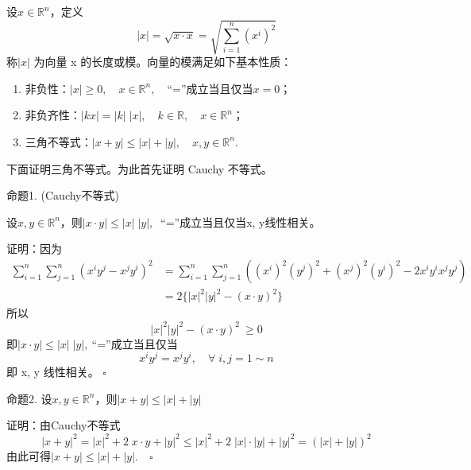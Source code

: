 \documentclass{article}
\begin{document}
\vspace{20pt}
设\(x \in \mathbb{R}^n\)，定义
\begin{equation*}
    | x |= \sqrt{x \cdot x} = \sqrt{\sum_{i=1}^n (x^i)^2 }
\end{equation*}
称\(| x |\) 为向量 x 的长度或模。向量的模满足如下基本性质：
\begin{enumerate}
    \item 非负性：\(| x | \ge 0,\quad x \in \mathbb{R}^n, \quad \)“=”成立当且仅当\(x = 0\)；
    \item 非负齐性：\(| kx |= | k |\; | x |,\quad k \in \mathbb{R},\quad x \in \mathbb{R}^n\)；
    \item 三角不等式：\(| x + y | \le | x |+ | y |,\quad x, y \in \mathbb{R}^n\).
\end{enumerate}

\newpage

下面证明三角不等式。为此首先证明 Cauchy 不等式。

\vspace{10pt}

\noindent 命题1. (Cauchy不等式)

设\(x, y \in \mathbb{R}^n\)，则\(| x \cdot y | \le | x |\; | y |,\  \) “=”成立当且仅当x, y线性相关。

\vspace{20pt}

\noindent 证明：因为
\begin{align*}
    \sum_{i=1}^n \sum_{j = 1}^n(x^i y^j - x^j y^i )^2 &=  \sum_{i = 1}^n \sum_{j = 1}^n ((x^i)^2(y^j)^2 + (x^j)^2(y^i)^2 - 2x^i y^i x^j y^j) \\
    &= 2 \{| x |^2 | y |^2 - (x \cdot y)^2\}
\end{align*}
所以
\begin{equation*}
    | x |^2 | y |^2 - (x \cdot y)^2\ \ge 0
\end{equation*}
即\(| x \cdot y | \le | x |\; | y |, \ \)“=”成立当且仅当
\begin{equation*}
    x^i y^j = x^j y^i,\quad \forall \; i, j = 1 \sim n
\end{equation*}
即 x, y 线性相关。 \(\square\)

\newpage

\noindent 命题2. 设\(x, y \in \mathbb{R}^n\)，则\(| x + y | \le | x |+ | y |\)

\vspace{20pt}

\noindent 证明：由Cauchy不等式
\begin{equation*}
    | x + y |^2 = | x |^2 + 2\;x \cdot y + | y |^2 \le | x |^2 + 2\; | x | \cdot | y | + | y |^2 = (| x |+ | y |)^2
\end{equation*}
由此可得\(| x + y | \le | x |+ | y |.\quad \square\)
\end{document}
